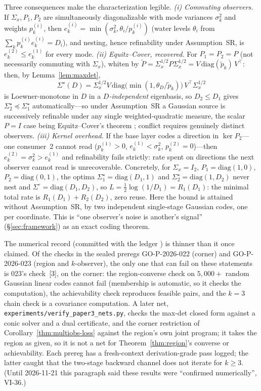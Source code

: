\documentclass[11pt]{article}
\theoremstyle{definition}
\theoremstyle{remark}
\begin{document}
Three consequences make the characterization legible. \emph{(i) Commuting observers.} If
$\Sigma_x,P_1,P_2$ are simultaneously diagonalizable with mode variances $\sigma_k^2$
and weights $p_k^{(i)}$, then $e_k^{(i)}=\min(\sigma_k^2,\theta_i/p_k^{(i)})$ (water
levels $\theta_i$ from $\sum_k p_k^{(i)}e_k^{(i)}=D_i$), and nesting, hence refinability under
Assumption~SR, is $e_k^{(2)}\le e_k^{(1)}$ for every mode. \emph{(ii) Equitz--Cover, recovered.} For $P_1=P_2=P$ (not
necessarily commuting with $\Sigma_x$), whiten by $\tilde P=\Sigma_x^{1/2}P
\Sigma_x^{1/2}=V\,\mathrm{diag}(\tilde p_k)\,V^\top$: then, by Lemma~\ref{lem:maxdet},
\[\Sigma^\star(D)=\Sigma_x^{1/2}V\,\mathrm{diag}\bigl(\min(1,\theta_D/\tilde p_k)\bigr)\,
V^\top\Sigma_x^{1/2}\]
is Loewner-monotone in $D$ in a \emph{$D$-independent} eigenbasis, so $D_2\le D_1$ gives
$\Sigma_2^\star\preceq\Sigma_1^\star$ automatically---so under Assumption~SR a Gaussian
source is successively refinable under any single weighted-quadratic measure, the scalar
$P=I$ case being Equitz--Cover's theorem \cite{equitzcover}; conflict requires genuinely distinct observers. \emph{(iii) Kernel overhead.} If the base layer codes a direction in
$\ker P_2$---one consumer~2 cannot read ($p_k^{(1)}>0$, $e_k^{(1)}<\sigma_k^2$,
$p_k^{(2)}=0$)---then $e_k^{(2)}=\sigma_k^2>e_k^{(1)}$ and refinability fails strictly:
rate spent on directions the next observer cannot read is unrecoverable. Concretely, for
$\Sigma_x=I_2$, $P_1=\mathrm{diag}(1,0)$, $P_2=\mathrm{diag}(0,1)$, the optima
$\Sigma_1^\star=\mathrm{diag}(D_1,1)$ and $\Sigma_2^\star=\mathrm{diag}(1,D_2)$ never
nest and $\Sigma^\circ=\mathrm{diag}(D_1,D_2)$, so $L=\tfrac12\log(1/D_1)=R_1(D_1)$: the
minimal total rate is $R_1(D_1)+R_2(D_2)$, zero reuse. Here the bound is attained
without Assumption~SR, by two independent single-stage Gaussian codes, one per coordinate.
This is ``one observer's noise is another's signal'' (\S\ref{sec:framework}) as an exact
coding theorem.

The numerical record (committed with the ledger \cite{ledger2026}) is thinner than it
once claimed. Of the checks in the sealed preregs GO-P-2026-022 (corner) and GO-P-2026-023
(region and $k$-observer), the only one that can fail on these statements is 023's
check~[3], on the corner: the region-converse check on $5{,}000+$ random Gaussian linear
codes cannot fail (membership is automatic, so it checks the computation), the
achievability check reproduces feasible pairs, and the $k=3$ chain check is a covariance
computation. A later net, \texttt{experiments/verify\_paper3\_nets.py}, checks the max-det
closed form against a conic solver and a dual certificate, and the corner restriction of
Corollary~\ref{thm:multiobs-loss} against the region's own joint program; it takes the
region as given, so it is not a net for Theorem~\ref{thm:region}'s converse or
achievability. Each prereg has a fresh-context derivation-grade pass logged; the latter
caught that the two-stage backward channel does not iterate for $k\ge3$. (Until
2026-11-21 this paragraph said these results were ``confirmed numerically'', VI-36.)
\end{document}
